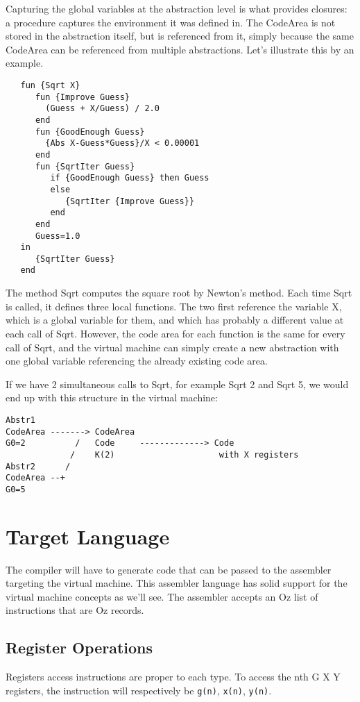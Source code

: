 \documentclass[a4paper]{memoir}
\begin{document}
Capturing the global variables at the abstraction level is what provides
closures: a procedure captures the environment it was defined in.
The CodeArea is not stored in the abstraction itself, but is referenced from
it, simply because the same CodeArea can be referenced from multiple
abstractions. Let's illustrate this by an example. 


\begin{lstlisting}
   fun {Sqrt X}
      fun {Improve Guess}
        (Guess + X/Guess) / 2.0
      end
      fun {GoodEnough Guess}
        {Abs X-Guess*Guess}/X < 0.00001
      end
      fun {SqrtIter Guess}
         if {GoodEnough Guess} then Guess
         else
            {SqrtIter {Improve Guess}}
         end
      end
      Guess=1.0
   in
      {SqrtIter Guess}
   end
\end{lstlisting}
The method Sqrt computes the square root by Newton's method. Each time Sqrt is
called, it defines three local functions. The two first reference the variable
X, which is a global variable for them, and which has probably a different
value at each call of Sqrt. However, the code area for each function is the
same for every call of Sqrt, and the virtual machine can simply create a new
abstraction with one global variable referencing the already existing code
area. 

If we have 2 simultaneous calls to Sqrt, for example {Sqrt 2} and {Sqrt 5}, we
would end up with this structure in the virtual machine:

\begin{verbatim}
Abstr1
CodeArea -------> CodeArea
G0=2          /   Code     -------------> Code
             /    K(2)                     with X registers
Abstr2      /
CodeArea --+
G0=5
\end{verbatim}



\section{Target Language}
The compiler will have to generate code that can be passed to the assembler targeting the virtual machine. This assembler language has solid support for the virtual machine concepts as we'll see.
The assembler accepts an Oz list of instructions that are Oz records. 

\subsection{Register Operations}\label{sec:intro:opcode:registers}
Registers access instructions are proper to each type. To access the nth G X Y
registers, the instruction will respectively be \lstinline!g(n)!,
\lstinline!x(n)!, \lstinline!y(n)!. 
\end{document}
